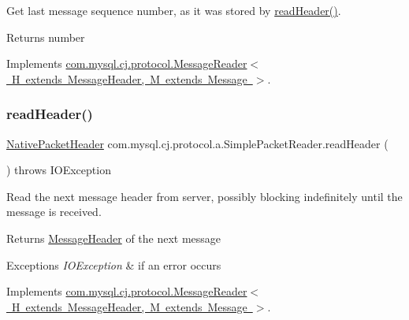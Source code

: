 Get last message sequence number, as it was stored by \mbox{\hyperlink{classcom_1_1mysql_1_1cj_1_1protocol_1_1a_1_1_simple_packet_reader_a2f65d760ce356bbb432f3d8e804a24bc}{read\+Header()}}.

\begin{DoxyReturn}{Returns}
number 
\end{DoxyReturn}


Implements \mbox{\hyperlink{interfacecom_1_1mysql_1_1cj_1_1protocol_1_1_message_reader_ac4a36fb287c5308dd3d7e6157ef4e237}{com.\+mysql.\+cj.\+protocol.\+Message\+Reader$<$ H extends Message\+Header, M extends Message $>$}}.

\mbox{\label{classcom_1_1mysql_1_1cj_1_1protocol_1_1a_1_1_simple_packet_reader_a2f65d760ce356bbb432f3d8e804a24bc}} 
\subsubsection{\texorpdfstring{read\+Header()}{readHeader()}}
{\footnotesize\ttfamily \mbox{\hyperlink{classcom_1_1mysql_1_1cj_1_1protocol_1_1a_1_1_native_packet_header}{Native\+Packet\+Header}} com.\+mysql.\+cj.\+protocol.\+a.\+Simple\+Packet\+Reader.\+read\+Header (\begin{DoxyParamCaption}{ }\end{DoxyParamCaption}) throws I\+O\+Exception}

Read the next message header from server, possibly blocking indefinitely until the message is received.

\begin{DoxyReturn}{Returns}
\mbox{\hyperlink{interfacecom_1_1mysql_1_1cj_1_1protocol_1_1_message_header}{Message\+Header}} of the next message 
\end{DoxyReturn}

\begin{DoxyExceptions}{Exceptions}
{\em I\+O\+Exception} & if an error occurs \\
\hline
\end{DoxyExceptions}


Implements \mbox{\hyperlink{interfacecom_1_1mysql_1_1cj_1_1protocol_1_1_message_reader_a09745b0e30f74fa13e2b32f22ce70cbb}{com.\+mysql.\+cj.\+protocol.\+Message\+Reader$<$ H extends Message\+Header, M extends Message $>$}}.


